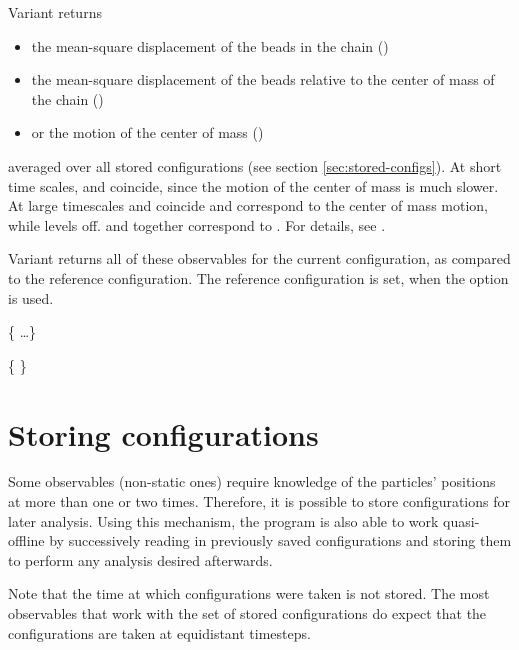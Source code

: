 Variant  returns 
\begin{itemize}
\item the mean-square displacement of the beads in the
  chain ()
\item the mean-square displacement of the beads relative
  to the center of
  mass of the chain ()
\item or the motion of the center of mass ()
\end{itemize}
averaged over all stored configurations (see section
\vref{sec:stored-configs}). At short time scales,  and
 coincide, since the motion of the center of mass is much
slower.  At large timescales  and  coincide and
correspond to the center of mass motion, while  levels
off.  and  together correspond to . For
details, see \citet{grest86a}.

Variant  returns all of these observables for the current
configuration, as compared to the reference configuration. The
reference configuration is set, when the option  is used.

\begin{code}
  \{   \dots \}
\end{code}

\begin{code}
  \{    \}
\end{code}

\section{Storing configurations}
\label{sec:stored-configs}

Some observables (\ie non-static ones) require knowledge of the
particles' positions at more than one or two times. Therefore, it is
possible to store configurations for later analysis.  Using this
mechanism, the program is also able to work quasi-offline by
successively reading in previously saved configurations and storing
them to perform any analysis desired afterwards.

Note that the time at which configurations were taken is not
stored.  The most observables that work with the set of stored
configurations do expect that the configurations are taken at
equidistant timesteps.

